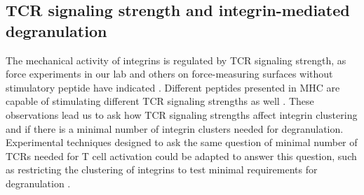 

\subsection{TCR signaling strength and integrin-mediated degranulation}

The mechanical activity of integrins is regulated by TCR signaling strength, as  force experiments in our lab and others on force-measuring surfaces without stimulatory peptide have indicated \cite{Ma2012, Feng2018, Chen2013, Harrison2019}. Different peptides presented in MHC are capable of stimulating different TCR signaling strengths as well \cite{Moran2011}. These observations lead us to ask how TCR signaling strengths affect integrin clustering and if there is a minimal number of integrin clusters needed for degranulation. Experimental techniques designed to ask the same question of minimal number of TCRs needed for T cell activation could be adapted to answer this question, such as restricting the clustering of integrins to test minimal requirements for degranulation \cite{Hashimoto-Tane2016, Labrecque2001, Manz2011}. 

